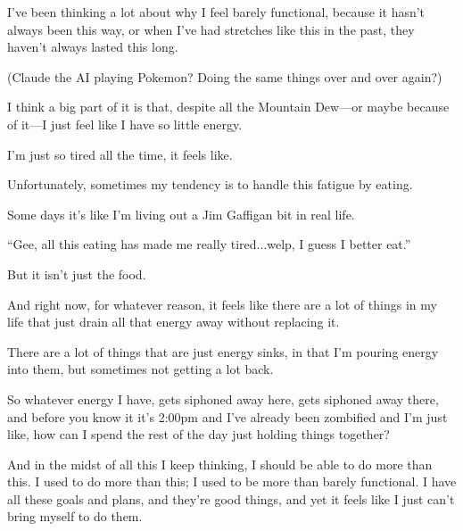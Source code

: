 \begin{compactitem}
			\item I've been thinking a lot about why I feel barely functional, because it hasn't always been this way, or when I've had stretches like this in the past, they haven't always lasted this long.
				\begin{compactitem}
					\item (Claude the AI playing Pokemon? Doing the same things over and over again?)
					\item I think a big part of it is that, despite all the Mountain Dew---or maybe because of it---I just feel like I have so little energy.
					\item I'm just so tired all the time, it feels like.
					\item Unfortunately, sometimes my tendency is to handle this fatigue by eating.
						\begin{compactitem}
							\item Some days it's like I'm living out a Jim Gaffigan bit in real life.
							\item ``Gee, all this eating has made me really tired...welp, I guess I better eat.''
						\end{compactitem}
					\item But it isn't just the food. 
					\item And right now, for whatever reason, it feels like there are a lot of things in my life that just drain all that energy away without replacing it.
					\item There are a lot of things that are just energy sinks, in that I'm pouring energy into them, but sometimes not getting a lot back.
					\item So whatever energy I have, gets siphoned away here, gets siphoned away there, and before you know it it's 2:00pm and I've already been zombified and I'm just like, how can I spend the rest of the day just holding things together? 
					\item And in the midst of all this I keep thinking, I should be able to do more than this. I used to do more than this; I used to be more than barely functional. I have all these goals and plans, and they're good things, and yet it feels like I just can't bring myself to do them. 
				\end{compactitem}
				

\end{compactitem}
